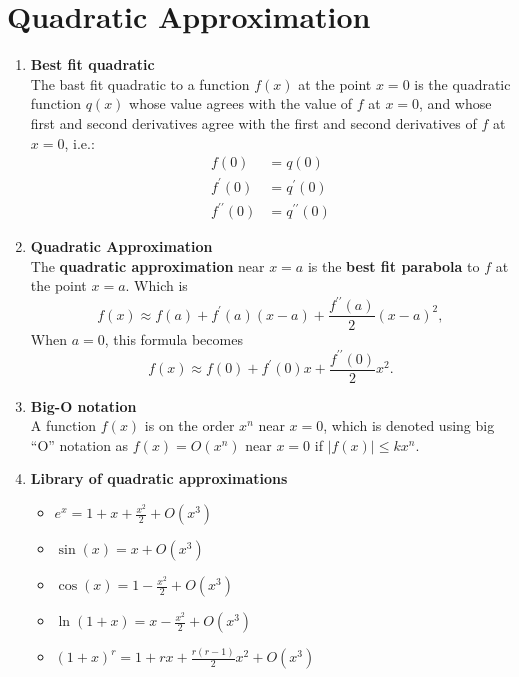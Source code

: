 \section{Quadratic Approximation}
\begin{enumerate}
    \item \textbf{Best fit quadratic}\\
        \indent The bast fit quadratic to a function \(f(x)\) at the point \(x=0\) is the quadratic function \(q(x)\) whose value agrees with the value of \(f\) at \(x=0\), and whose first and second derivatives agree with the first and second derivatives of \(f\) at \(x=0\), i.e.:
        \begin{align*}
            f(0) & =q(0) \\
            f^\prime (0) & =q^\prime (0) \\
            f^{\prime\prime}(0) & =q^{\prime\prime}(0)
        \end{align*}
    \item \textbf{Quadratic Approximation}\\
        \indent The \textbf{quadratic approximation} near \(x=a\) is the \textbf{best fit parabola} to \(f\) at the point \(x=a\). Which is 
        \[
            f(x)\approx f(a)+f^\prime (a)(x-a)+\frac{f^{\prime\prime}(a)}{2}(x-a)^2,
        \]
        When \(a=0\), this formula becomes
        \[
            f(x)\approx f(0)+f^\prime (0)x+\frac{f^{\prime\prime}(0)}{2}x^2.
        \]
    \item \textbf{Big-O notation}\\
        \indent A function \(f(x)\) is on the order \(x^n\) near \(x=0\), which is denoted using big ``O'' notation as \(f(x)=O(x^n)\) near \(x=0\) if \(|f(x)|\leq kx^n\).
    \item \textbf{Library of quadratic approximations}
        \begin{itemize}
            \item \(e^x=1+x+\frac{x^2}{2}+O(x^3)\)
            \item \(\sin(x)=x+O(x^3)\)
            \item \(\cos(x)=1-\frac{x^2}{2}+O(x^3)\)
            \item \(\ln(1+x)=x-\frac{x^2}{2}+O(x^3)\)
            \item \((1+x)^r=1+rx+\frac{r(r-1)}{2}x^2+O(x^3)\)
        \end{itemize}
\end{enumerate}

